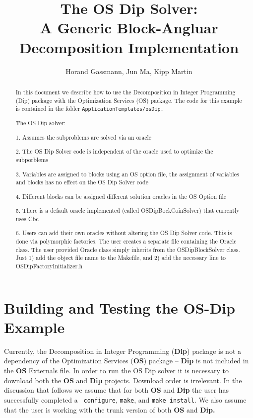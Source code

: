 \documentclass[11pt]{article}
\begin{document}
\title{The OS Dip Solver:\\
A Generic Block-Angluar Decomposition Implementation}
\vskip 2in
\author{Horand Gassmann, Jun Ma,  Kipp Martin}
\maketitle

\begin{abstract}
In this document we describe how to use the Decomposition in Integer Programming
(Dip) package with the Optimization Services (OS) package.  The code for this
example is contained in the folder {\tt  ApplicationTemplates/osDip.}


The OS Dip solver:

1. Assumes the subproblems are solved via an oracle

2. The OS Dip Solver code is independent of the oracle used to optimize the
subporblems

3. Variables are assigned to blocks using an OS option file, the assignment of
variables and blocks has no effect on the OS Dip Solver code

4. Different blocks can be assigned different solution oracles in the OS Option
file

5. There is a default oracle implemented (called OSDipBockCoinSolver) that
currently uses Cbc

6. Users can add their own oracles without altering the OS Dip Solver code. This
is done via polymorphic factories. The user creates a separate file containing
the Oracle class. The user provided Oracle class simply inherits from the
OSDipBlockSolver class. Just 1) add the object file name to the Makefile, and 2)
add the necessary line to OSDipFactoryInitializer.h

\end{abstract}


\newpage
{}


 

\newpage

\section{Building and Testing the OS-Dip Example}\label{section:build}

Currently, the Decomposition in Integer Programming ({\bf Dip}) package is not a
dependency of the Optimization Services ({\bf OS}) package -- {\bf Dip} is not
included in the {\bf OS} Externals file. In order to run the OS Dip solver it is
necessary to download both the {\bf OS} and {\bf  Dip} projects. Download order is irrelevant. 
In the discussion that follows we assume that for both 
{\bf OS} and {\bf Dip} the user has successfully completed a {\tt
configure}, {\tt make}, and {\tt make install}. We also assume
that the user is working with the trunk version of both {\bf OS} and {\bf Dip.}
\end{document}
